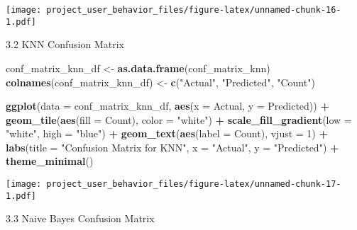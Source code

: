\documentclass[
]{article}
\newenvironment{Shaded}{\begin{snugshade}}{\end{snugshade}}
\newcommand{\AttributeTok}[1]{\textcolor[rgb]{0.13,0.29,0.53}{#1}}
\newcommand{\DecValTok}[1]{\textcolor[rgb]{0.00,0.00,0.81}{#1}}
\newcommand{\FunctionTok}[1]{\textcolor[rgb]{0.13,0.29,0.53}{\textbf{#1}}}
\newcommand{\NormalTok}[1]{#1}
\newcommand{\OtherTok}[1]{\textcolor[rgb]{0.56,0.35,0.01}{#1}}
\newcommand{\SpecialCharTok}[1]{\textcolor[rgb]{0.81,0.36,0.00}{\textbf{#1}}}
\newcommand{\StringTok}[1]{\textcolor[rgb]{0.31,0.60,0.02}{#1}}
\begin{document}
\texttt{[image: project\_user\_behavior\_files/figure-latex/unnamed-chunk-16-1.pdf]}

3.2 KNN Confusion Matrix

\begin{Shaded}
\begin{Highlighting}[]
\NormalTok{conf\_matrix\_knn\_df }\OtherTok{\textless{}{-}} \FunctionTok{as.data.frame}\NormalTok{(conf\_matrix\_knn)}
\FunctionTok{colnames}\NormalTok{(conf\_matrix\_knn\_df) }\OtherTok{\textless{}{-}} \FunctionTok{c}\NormalTok{(}\StringTok{"Actual"}\NormalTok{, }\StringTok{"Predicted"}\NormalTok{, }\StringTok{"Count"}\NormalTok{)}

\FunctionTok{ggplot}\NormalTok{(}\AttributeTok{data =}\NormalTok{ conf\_matrix\_knn\_df, }\FunctionTok{aes}\NormalTok{(}\AttributeTok{x =}\NormalTok{ Actual, }\AttributeTok{y =}\NormalTok{ Predicted)) }\SpecialCharTok{+}
  \FunctionTok{geom\_tile}\NormalTok{(}\FunctionTok{aes}\NormalTok{(}\AttributeTok{fill =}\NormalTok{ Count), }\AttributeTok{color =} \StringTok{"white"}\NormalTok{) }\SpecialCharTok{+}
  \FunctionTok{scale\_fill\_gradient}\NormalTok{(}\AttributeTok{low =} \StringTok{"white"}\NormalTok{, }\AttributeTok{high =} \StringTok{"blue"}\NormalTok{) }\SpecialCharTok{+}
  \FunctionTok{geom\_text}\NormalTok{(}\FunctionTok{aes}\NormalTok{(}\AttributeTok{label =}\NormalTok{ Count), }\AttributeTok{vjust =} \DecValTok{1}\NormalTok{) }\SpecialCharTok{+}
  \FunctionTok{labs}\NormalTok{(}\AttributeTok{title =} \StringTok{"Confusion Matrix for KNN"}\NormalTok{, }\AttributeTok{x =} \StringTok{"Actual"}\NormalTok{, }\AttributeTok{y =} \StringTok{"Predicted"}\NormalTok{) }\SpecialCharTok{+}
  \FunctionTok{theme\_minimal}\NormalTok{()}
\end{Highlighting}
\end{Shaded}

\texttt{[image: project\_user\_behavior\_files/figure-latex/unnamed-chunk-17-1.pdf]}

3.3 Naive Bayes Confusion Matrix
\end{document}
